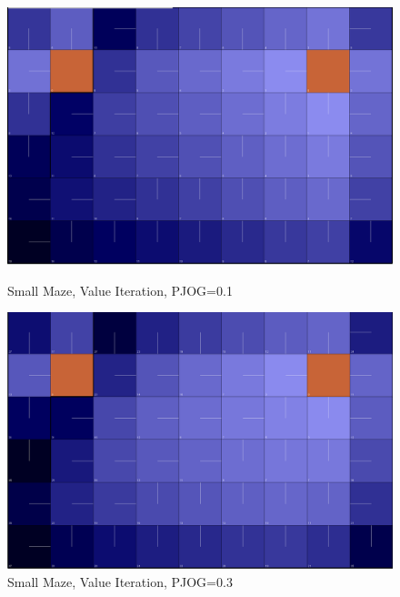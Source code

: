 \documentclass[11pt]{article}
\begin{document}
\begin{figure}[!htb]
   \begin{minipage}{0.4\textwidth}
     \centering
     \includegraphics[width=1.2\linewidth]{../figures/value1_1.png}
     \caption{Small Maze, Value Iteration, PJOG=0.1}\label{Fig:value1_1}
   \end{minipage}\hfill
   \begin{minipage}{0.4\textwidth}
     \centering
     \includegraphics[width=1.2\linewidth]{../figures/value1_3.png}
     \caption{Small Maze, Value Iteration, PJOG=0.3}\label{Fig:value1_3}
   \end{minipage}
\end{figure}
\end{document}
